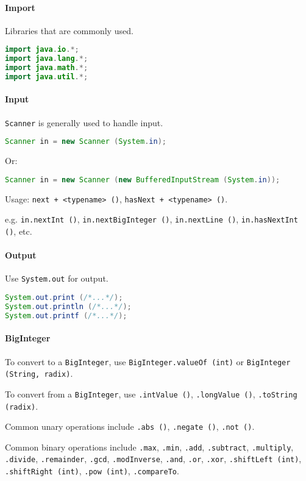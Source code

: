 \paragraph{Import}
Libraries that are commonly used.
\begin{lstlisting}[language=java]
import java.io.*;
import java.lang.*;
import java.math.*;
import java.util.*;
\end{lstlisting}

\paragraph{Input}
\texttt{Scanner} is generally used to handle input.
\begin{lstlisting}[language=java]
Scanner in = new Scanner (System.in);
\end{lstlisting}
Or:
\begin{lstlisting}[language=java]
Scanner in = new Scanner (new BufferedInputStream (System.in));
\end{lstlisting}
Usage: \texttt{next + <typename> ()}, \texttt{hasNext + <typename> ()}.

e.g. \texttt{in.nextInt ()}, \texttt{in.nextBigInteger ()}, \texttt{in.nextLine ()}, \texttt{in.hasNextInt ()}, etc.

\paragraph{Output}
Use \texttt{System.out} for output.
\begin{lstlisting}[language=java]
System.out.print (/*...*/);
System.out.println (/*...*/);
System.out.printf (/*...*/);
\end{lstlisting}

\paragraph{BigInteger}
To convert to a \texttt{BigInteger}, use \texttt{BigInteger.valueOf (int)} or \texttt{BigInteger (String, radix)}.

To convert from a \texttt{BigInteger}, use \texttt{.intValue ()}, \texttt{.longValue ()}, \texttt{.toString (radix)}.

Common unary operations include \texttt{.abs ()}, \texttt{.negate ()}, \texttt{.not ()}.

Common binary operations include \texttt{.max}, \texttt{.min}, \texttt{.add}, \texttt{.subtract}, \texttt{.multiply}, \texttt{.divide}, \texttt{.remainder}, \texttt{.gcd}, \texttt{.modInverse}, \texttt{.and}, \texttt{.or}, \texttt{.xor}, \texttt{.shiftLeft (int)}, \texttt{.shiftRight (int)}, \texttt{.pow (int)}, \texttt{.compareTo}.

